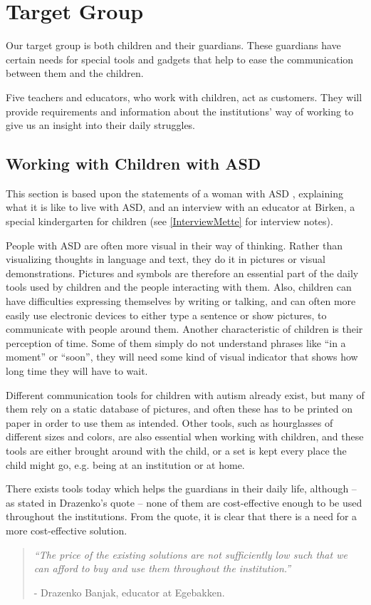 \section{Target Group}
Our target group is both children and their guardians. These guardians have certain needs for special tools and gadgets that help to ease the communication between them and the children.

Five teachers and educators, who work with children, act as customers. They will provide requirements and information about the institutions' way of working to give us an insight into their daily struggles.

\subsection{Working with Children with ASD}
This section is based upon the statements of a woman with ASD \cite{autism.com}, explaining what it is like to live with ASD, and an interview with an educator at Birken, a special kindergarten for children (see \autoref{InterviewMette} for interview notes).

	People with ASD are often more visual in their way of thinking. Rather than visualizing thoughts in language and text, they do it in pictures or visual demonstrations. Pictures and symbols are therefore an essential part of the daily tools used by children and the people interacting with them. Also, children can have difficulties expressing themselves by writing or talking, and can often more easily use electronic devices to either type a sentence or show pictures, to communicate with people around them.
	Another characteristic of children is their perception of time. Some of them simply do not understand phrases like ``in a moment'' or ``soon'', they will need some kind of visual indicator that shows how long time they will have to wait.

Different communication tools for children with autism already exist, but many of them rely on a static database of pictures, and often these has to be printed on paper in order to use them as intended. Other tools, such as hourglasses of different sizes and colors, are also essential when working with children, and these tools are either brought around with the child, or a set is kept every place the child might go, e.g. being at an institution or at home.

There exists tools today which helps the guardians in their daily life, although -- as stated in Drazenko's quote -- none of them are cost-effective enough to be used throughout the institutions. From the quote, it is clear that there is a need for a more cost-effective solution.

\begin{quotation}
\textit{``The price of the existing solutions are not sufficiently low such that we can afford to buy and use them throughout the institution.''}\\ 
	\begin{flushright}
		- Drazenko Banjak, educator at Egebakken.
	\end{flushright}
\end{quotation}